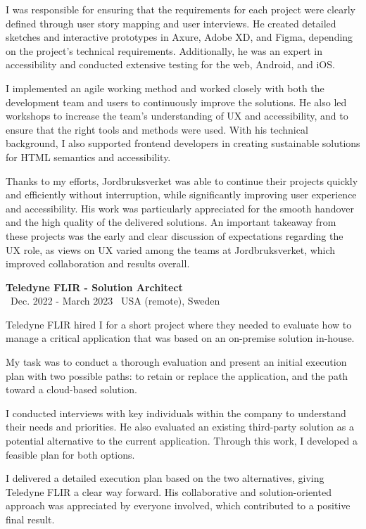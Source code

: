 \documentclass[a4paper,10pt]{article}
\begin{document}
I was responsible for ensuring that the requirements for each project were clearly defined through user story mapping and user interviews. He created detailed sketches and interactive prototypes in Axure, Adobe XD, and Figma, depending on the project's technical requirements. Additionally, he was an expert in accessibility and conducted extensive testing for the web, Android, and iOS.

I implemented an agile working method and worked closely with both the development team and users to continuously improve the solutions. He also led workshops to increase the team's understanding of UX and accessibility, and to ensure that the right tools and methods were used. With his technical background, I also supported frontend developers in creating sustainable solutions for HTML semantics and accessibility.

Thanks to my efforts, Jordbruksverket was able to continue their projects quickly and efficiently without interruption, while significantly improving user experience and accessibility. His work was particularly appreciated for the smooth handover and the high quality of the delivered solutions. An important takeaway from these projects was the early and clear discussion of expectations regarding the UX role, as views on UX varied among the teams at Jordbruksverket, which improved collaboration and results overall.

\vspace{0.5cm}
\textbf{Teledyne FLIR - Solution Architect}\\
\normalsize \faCalendar \ Dec. 2022 - March 2023 \quad \faMapMarker \ USA (remote), Sweden

Teledyne FLIR hired I for a short project where they needed to evaluate how to manage a critical application that was based on an on-premise solution in-house.

My task was to conduct a thorough evaluation and present an initial execution plan with two possible paths: to retain or replace the application, and the path toward a cloud-based solution.

I conducted interviews with key individuals within the company to understand their needs and priorities. He also evaluated an existing third-party solution as a potential alternative to the current application. Through this work, I developed a feasible plan for both options.

I delivered a detailed execution plan based on the two alternatives, giving Teledyne FLIR a clear way forward. His collaborative and solution-oriented approach was appreciated by everyone involved, which contributed to a positive final result.
\end{document}
